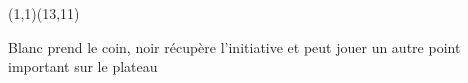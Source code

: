 \documentclass[preview, border=0pt, varwidth=false]{standalone}
\begin{document}
	\setgounit{0.6cm} 
	
\parbox[c][14.65cm][c]{10.2cm}{
	\centering
	
	\begin{psgopartialboard}{(1,1)(13,11)}
		\pass
	\end{psgopartialboard}
	
	\vspace{1em}
	Blanc prend le coin, noir récupère l'initiative et peut jouer un autre point important sur le plateau
}
\end{document}
